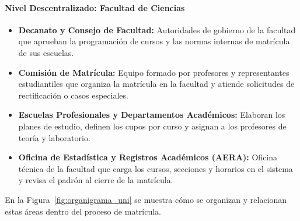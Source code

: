\paragraph{Nivel Descentralizado: Facultad de Ciencias}
\begin{itemize}
    \item \textbf{Decanato y Consejo de Facultad:} Autoridades de gobierno de la facultad que aprueban la programación de cursos y las normas internas de matrícula de sus escuelas.
    \item \textbf{Comisión de Matrícula:} Equipo formado por profesores y representantes estudiantiles que organiza la matrícula en la facultad y atiende solicitudes de rectificación o casos especiales.
    \item \textbf{Escuelas Profesionales y Departamentos Académicos:} Elaboran los planes de estudio, definen los cupos por curso y asignan a los profesores de teoría y laboratorio.
    \item \textbf{Oficina de Estadística y Registros Académicos (AERA):} Oficina técnica de la facultad que carga los cursos, secciones y horarios en el sistema y revisa el padrón al cierre de la matrícula.
\end{itemize}

En la Figura~\ref{fig:organigrama_uni} se muestra cómo se organizan y relacionan estas áreas dentro del proceso de matrícula.


